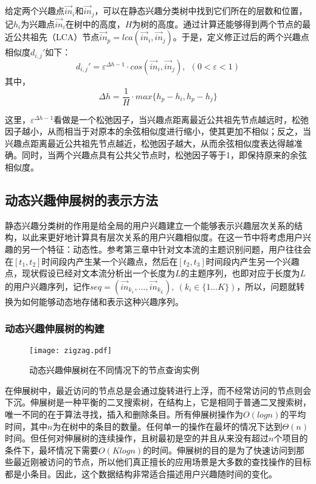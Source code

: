 给定两个兴趣点$\vec{in}_i$和$\vec{in}_j$，可以在静态兴趣分类树中找到它们所在的层数和位置，记$h_i$为兴趣点$\vec{in}_i$在树中的高度，$H$为树的高度。通过计算还能够得到两个节点的最近公共祖先（LCA）节点$\vec{in}_p=lca(\vec{in}_i,\vec{in}_j)$。于是，定义修正过后的两个兴趣点相似度$d_{i,j}'$如下：
\begin{equation}
  d_{i,j}'=\varepsilon^{\Delta h-1}\cdot cos(\vec{in}_i,\vec{in}_j),~~(0<\varepsilon<1)
\end{equation}
其中，
\begin{equation*}
\Delta h=\frac{1}{H}\cdot max\{h_p-h_i,h_p-h_j\}
\end{equation*}

这里，$\varepsilon^{\Delta h-1}$看做是一个松弛因子，当兴趣点距离最近公共祖先节点越远时，松弛因子越小，从而相当于对原本的余弦相似度进行缩小，使其更加不相似；反之，当兴趣点距离最近公共祖先节点越近，松弛因子越大，从而余弦相似度表达得越准确。同时，当两个兴趣点具有公共父节点时，松弛因子等于1，即保持原来的余弦相似度。

\subsection{动态兴趣伸展树的表示方法}
静态兴趣分类树的作用是给全局的用户兴趣建立一个能够表示兴趣层次关系的结构，以此来更好地计算具有层次关系的用户兴趣相似度。在这一节中将考虑用户兴趣的另一个特征：动态性。参考第三章中针对文本流的主题识别问题，用户往往会在$[t_1,t_2]$时间段内产生某一个兴趣点，然后在$[t_2,t_3]$时间段内产生另一个兴趣点，现状假设已经对文本流分析出一个长度为$L$的主题序列，也即对应于长度为$L$的用户兴趣序列，记作$seq=(\vec{in}_{k_1},...,\vec{in}_{k_L}),~(k_i\in\{1...K\})$，所以，问题就转换为如何能够动态地存储和表示这种兴趣序列。

\subsubsection{动态兴趣伸展树的构建}
\begin{figure}[ht]
\centering
\texttt{[image: zigzag.pdf]}
\caption{动态兴趣伸展树在不同情况下的节点查询实例}
\label{fig:zigzag}
\end{figure}

在伸展树中，最近访问的节点总是会通过旋转进行上浮，而不经常访问的节点则会下沉。伸展树是一种平衡的二叉搜索树，在结构上，它是相同于普通二叉搜索树，唯一不同的在于算法寻找，插入和删除条目。所有伸展树操作为$O(log n)$的平均时间，其中$n$为在树中的条目的数量。任何单一的操作在最坏的情况下达到$\Theta(n)$时间。但任何对伸展树的连续操作，且树最初是空的并且从来没有超过$n$个项目的条件下，最坏情况下需要$O(K log n)$的时间。伸展树的目的是为了快速访问到那些最近刚被访问的节点，所以他们真正擅长的应用场景是大多数的查找操作的目标都是小条目。因此，这个数据结构非常适合描述用户兴趣随时间的变化。

